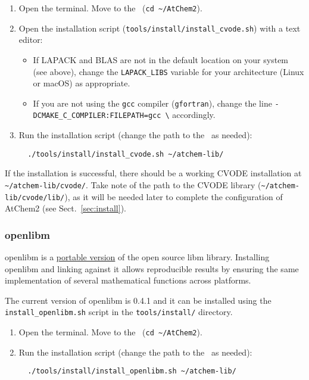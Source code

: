 \begin{enumerate}
\item Open the terminal. Move to the \maindir\ (\verb|cd ~/AtChem2|).
\item Open the installation script (\texttt{tools/install/install\_cvode.sh})
  with a text editor:
  \begin{itemize}
  \item If LAPACK and BLAS are not in the default location on your
    system (see above), change the \texttt{LAPACK\_LIBS} variable for
    your architecture (Linux or macOS) as appropriate.
  \item If you are not using the \texttt{gcc} compiler
    (\texttt{gfortran}), change the line
    \texttt{-DCMAKE\_C\_COMPILER:FILEPATH=gcc \textbackslash}
    accordingly.
  \end{itemize}
\item Run the installation script (change the path to the \depdir\ as
  needed):
  \begin{verbatim}
  ./tools/install/install_cvode.sh ~/atchem-lib/
  \end{verbatim}
\end{enumerate}

If the installation is successful, there should be a working CVODE
installation at \texttt{\textasciitilde/atchem-lib/cvode/}. Take note
of the path to the CVODE library (\texttt{\textasciitilde/atchem-lib/cvode/lib/}),
as it will be needed later to complete the configuration of AtChem2
(see Sect.~\ref{sec:install}).

\subsubsection{openlibm}

openlibm is a \href{https://openlibm.org/}{portable version} of the
open source libm library. Installing openlibm and linking against it
allows reproducible results by ensuring the same implementation of
several mathematical functions across platforms.

The current version of openlibm is 0.4.1 and it can be installed using
the \texttt{install\_openlibm.sh} script in the \texttt{tools/install/}
directory.

\begin{enumerate}
\item Open the terminal. Move to the \maindir\ (\verb|cd ~/AtChem2|).
\item Run the installation script (change the path to the \depdir\ as
  needed):
  \begin{verbatim}
  ./tools/install/install_openlibm.sh ~/atchem-lib/
  \end{verbatim}
\end{enumerate}

